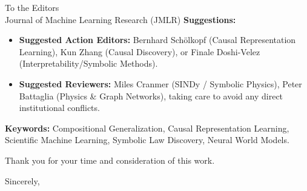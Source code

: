 \documentclass[11pt]{letter}
\begin{document}
\begin{letter}{To the Editors \\ Journal of Machine Learning Research (JMLR)}
\textbf{Suggestions:}
\begin{itemize}
    \item \textbf{Suggested Action Editors:} Bernhard Schölkopf (Causal Representation Learning), Kun Zhang (Causal Discovery), or Finale Doshi-Velez (Interpretability/Symbolic Methods).
    \item \textbf{Suggested Reviewers:} Miles Cranmer (SINDy / Symbolic Physics), Peter Battaglia (Physics \& Graph Networks), taking care to avoid any direct institutional conflicts.
\end{itemize}

\textbf{Keywords:} Compositional Generalization, Causal Representation Learning, Scientific Machine Learning, Symbolic Law Discovery, Neural World Models.

Thank you for your time and consideration of this work.

\closing{Sincerely,}

\end{letter}
\end{document}
